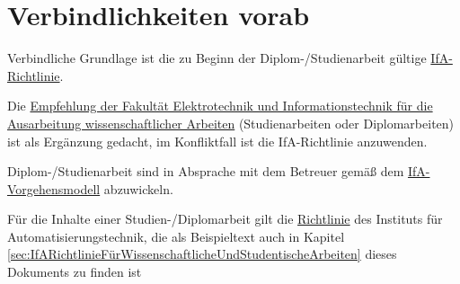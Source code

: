 
\chapter{Verbindlichkeiten vorab}
\label{sec:VerbindlichkeitenVorab}

\begin{compactitem}
  \item Verbindliche Grundlage ist die zu Beginn der Diplom-/Studienarbeit gültige \href{http://www.et.tu-dresden.de/ifa/index.php?id=330}{IfA-Richtlinie}.
  \item Die \href{http://www.et.tu-dresden.de/etit/uploads/media/EmpfehlungWissenschArbeiten2013_05.pdf}{Empfehlung der Fakultät Elektrotechnik und Informationstechnik für die Ausarbeitung wissenschaftlicher Arbeiten} (Studienarbeiten oder Diplomarbeiten) ist als Ergänzung gedacht, im Konfliktfall ist die IfA-Richtlinie anzuwenden.
  \item Diplom-/Studienarbeit sind in Absprache mit dem Betreuer gemäß dem \href{http://www.et.tu-dresden.de/ifa/index.php?id=331&L=1?keepThis=true}{IfA-Vorgehensmodell} abzuwickeln.
  \item Für die Inhalte einer Studien-/Diplomarbeit gilt die \href{http://www.et.tu-dresden.de/ifa/index.php?id=336&L=1?keepThis=true}{Richtlinie} des Instituts für Automatisierungstechnik, die als Beispieltext auch in Kapitel \ref{sec:IfARichtlinieFürWissenschaftlicheUndStudentischeArbeiten} dieses Dokuments zu finden ist
\end{compactitem}